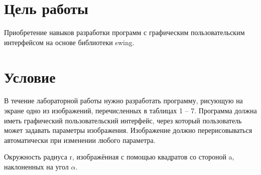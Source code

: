 \documentclass[a4paper, 14pt]{extarticle}
\begin{document}
\newpage
\section{Цель работы}
Приобретение навыков разработки программ с графическим пользовательским интерфейсом на основе библиотеки swing.

\section{Условие}
В течение лабораторной работы нужно разработать программу, рисующую на экране одно из изображений, перечисленных в таблицах 1 – 7. Программа должна иметь графический пользовательский интерфейс, через который пользователь может задавать параметры изображения. Изображение должно перерисовываться автоматически при изменении любого параметра.

Окружность радиуса r, изображённая с помощью квадратов со стороной a, наклоненных на угол \begin{math}\alpha\end{math}.
\end{document}
